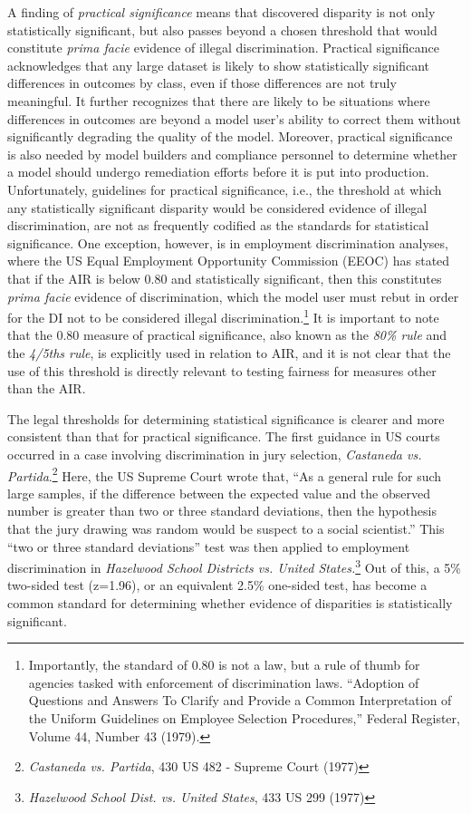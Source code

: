 \documentclass[information,article,submit,moreauthors,pdftex]{definitions/mdpi}
\begin{document}
A finding of \textit{practical significance} means that discovered disparity is not only statistically significant, but also passes beyond a chosen threshold that would constitute \textit{prima facie} evidence of illegal discrimination.  Practical significance acknowledges that any large dataset is likely to show statistically significant differences in outcomes by class, even if those differences are not truly meaningful.  It further recognizes that there are likely to be situations where differences in outcomes are beyond a model user’s ability to correct them without significantly degrading the quality of the model. Moreover, practical significance is also needed by model builders and compliance personnel to determine whether a model should undergo remediation efforts before it is put into production. Unfortunately, guidelines for practical significance, i.e., the threshold at which any statistically significant disparity would be considered evidence of illegal discrimination, are not as frequently codified as the standards for statistical significance.  One exception, however, is in employment discrimination analyses, where the US Equal Employment Opportunity Commission (EEOC) has stated that if the AIR is below 0.80 and statistically significant, then this constitutes \textit{prima facie} evidence of discrimination, which the model user must rebut in order for the DI not to be considered illegal discrimination.\footnote{Importantly, the standard of 0.80 is not a law, but a rule of thumb for agencies tasked with enforcement of discrimination laws.  ``Adoption of Questions and Answers To Clarify and Provide a Common Interpretation of the Uniform Guidelines on Employee Selection Procedures,'' Federal Register, Volume 44, Number 43 (1979).} It is important to note that the 0.80 measure of practical significance, also known as the \textit{80\% rule} and the \textit{4/5ths rule}, is explicitly used in relation to AIR, and it is not clear that the use of this threshold is directly relevant to testing fairness for measures other than the AIR.

The legal thresholds for determining statistical significance is clearer and more consistent than that for practical significance.  The first guidance in US courts occurred in a case involving discrimination in jury selection, \textit{Castaneda vs. Partida}.\footnote{\textit{Castaneda vs. Partida}, 430 US 482 - Supreme Court (1977)}   Here, the US Supreme Court wrote that, ``As a general rule for such large samples, if the difference between the expected value and the observed number is greater than two or three standard deviations, then the hypothesis that the jury drawing was random would be suspect to a social scientist.''  This ``two or three standard deviations'' test was then applied to employment discrimination in \textit{Hazelwood School Districts vs. United States.}\footnote{\textit{Hazelwood School Dist. vs. United States}, 433 US 299 (1977)} Out of this, a 5\% two-sided test (z=1.96), or an equivalent 2.5\% one-sided test, has become a common standard for determining whether evidence of disparities is statistically significant.
\end{document}
